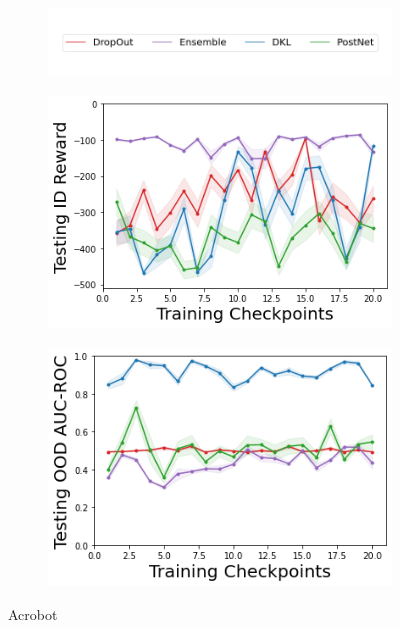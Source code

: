 \begin{figure}
    \centering
        \begin{subfigure}{.5\textwidth}
        \includegraphics[width=\textwidth]{sections/011_icml2022/resources/legend.png}
    \end{subfigure}
    \vspace{-5mm}
    
    \begin{subfigure}{.4\textwidth}
        \includegraphics[width=\textwidth]{sections/011_icml2022/resources/Acrobot-v1-mean_reward_-testing-model.png}  
    \end{subfigure}
    \begin{subfigure}{.4\textwidth}
        \includegraphics[width=\textwidth]{sections/011_icml2022/resources/AcrobotOOD-v0-AUC-ROC-epistemic_-testing-model.png}
    \end{subfigure}
        \vspace{-3mm}
    \caption*{Acrobot}
    \vspace{2mm}


\end{figure}
